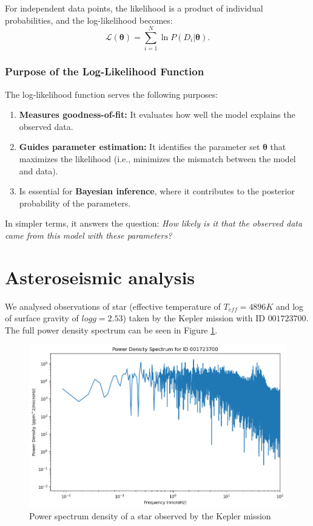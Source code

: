 \documentclass[12pt]{article}
\begin{document}
For independent data points, the likelihood is a product of individual probabilities, and the log-likelihood becomes:
\begin{equation}
    \mathcal{L}(\boldsymbol{\theta}) = \sum_{i=1}^N \ln P(D_i | \boldsymbol{\theta}).
\end{equation}

\subsubsection*{Purpose of the Log-Likelihood Function}
The log-likelihood function serves the following purposes:
\begin{enumerate}
    \item \textbf{Measures goodness-of-fit:} It evaluates how well the model explains the observed data.
    \item \textbf{Guides parameter estimation:} It identifies the parameter set $\boldsymbol{\theta}$ that maximizes the likelihood (i.e., minimizes the mismatch between the model and data).
    \item Is essential for \textbf{Bayesian inference}, where it contributes to the posterior probability of the parameters.
\end{enumerate}

In simpler terms, it answers the question: \textit{How likely is it that the observed data came from this model with these parameters?}

\section{Asteroseismic analysis}
We analysed observations of star (effective temperature of $T_{eff} = 4896K$ and log of surface gravity of $logg = 2.53$) taken by the Kepler mission with ID $001723700$. The full power density spectrum can be seen in Figure \ref{fig:pds}.

\begin{figure}[H]
  \centering
  \includegraphics[width=\linewidth]{pds.png}
  \caption{Power spectrum density of a star observed by the Kepler mission}
  \label{fig:pds}
\end{figure}
\end{document}
